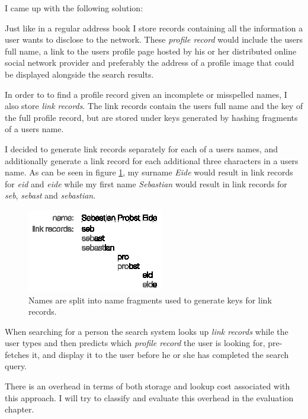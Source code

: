 I came up with the following solution:

Just like in a regular address book I store records containing all the information a user wants to disclose to the network. These \emph{profile record} would include the users full name, a link to the users profile page hosted by his or her distributed online social network provider and preferably the address of a profile image that could be displayed alongside the search results.

In order to to find a profile record given an incomplete or misspelled names, I also store \emph{link records}. The link records contain the users full name and the key of the full profile record, but are stored under keys generated by hashing fragments of a users name. 

I decided to generate link records separately for each of a users names, and additionally generate a link record for each additional three characters in a users name.
As can be seen in figure \ref{figLinkRecord}, my surname \emph{Eide} would result in link records for \emph{eid} and \emph{eide} while my first name \emph{Sebastian} would result in link records for \emph{seb}, \emph{sebast} and \emph{sebastian}.

\begin{figure}[!htb]
\begin{center}
	\includegraphics[width=0.6\linewidth]{illustrations/LinkRecords.eps}
  \caption{Names are split into name fragments used to generate keys for link records.}
  \label{figLinkRecord}
\end{center}
\end{figure}

When searching for a person the search system looks up \emph{link records} while the user types and then predicts which \emph{profile record} the user is looking for, pre-fetches it, and display it to the user before he or she has completed the search query.

There is an overhead in terms of both storage and lookup cost associated with this approach. I will try to classify and evaluate this overhead in the evaluation chapter.

